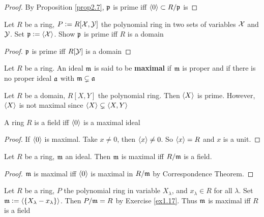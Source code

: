 \documentclass[11pt]{article}
\begin{document}
\begin{proof}
By Proposition \ref{prop2.7}, \(\mathfrak{p}\) is prime iff \(\langle0\rangle\subset R/\mathfrak{p}\) is
\end{proof}

\begin{exercise}
\label{ex2.9}
Let \(R\) be a ring, \(P:=R[\mathcal{X},\mathcal{Y}]\) the polynomial ring in two sets of
variables \(\mathcal{X}\) and \(\mathcal{Y}\). Set \(\mathfrak{p}:=\langle\mathcal{X}\rangle\). Show \(\mathfrak{p}\) is
prime iff \(R\) is a domain
\end{exercise}

\begin{proof}
\(\mathfrak{p}\) is prime iff \(R[\mathcal{Y}]\) is a domain
\end{proof}

\begin{definition}[]
Let \(R\) be a ring. An ideal \(\mathfrak{m}\) is said to be \textbf{maximal} if \(\mathfrak{m}\) is
proper and if there is no proper ideal \(\mathfrak{a}\) with \(\mathfrak{m}\subsetneq\mathfrak{a}\)
\end{definition}

\begin{examplle}[]
Let \(R\) be a domain, \(R[X,Y]\) the polynomial ring. Then \(\langle X\rangle\) is
prime. However, \(\langle X\rangle\) is not maximal since \(\langle X\rangle\subsetneq\langle X,Y\rangle\)
\end{examplle}

\begin{proposition}[]
\label{2.12}
A ring \(R\) is a field iff \(\langle0\rangle\) is a maximal ideal
\end{proposition}

\begin{proof}
If \(\langle0\rangle\) is  maximal. Take \(x\neq0\), then \(\langle x\rangle\neq0\). So \(\langle
   x\rangle=R\) and \(x\) is a unit.
\end{proof}

\begin{corollary}[]
\label{2.13}
Let \(R\) be a ring, \(\mathfrak{m}\) an ideal. Then \(\mathfrak{m}\) is maximal iff \(R/\mathfrak{m}\)
is a field.
\end{corollary}

\begin{proof}
\(\mathfrak{m}\) is maximal iff \(\langle0\rangle\) is maximal in \(R/\mathfrak{m}\) by Correspondence Theorem.
\end{proof}

\begin{examplle}[]
Let \(R\) be a ring, \(P\) the polynomial ring in variable \(X_\lambda\), and
\(x_\lambda\in R\) for all \(\lambda\). Set \(\mathfrak{m}:=\langle\{X_\lambda-x_\lambda\}\rangle\).
Then \(P/\mathfrak{m}=R\) by Exercise \ref{ex1.17}. Thus \(\mathfrak{m}\) is maximal iff \(R\) is a field
\end{examplle}
\end{document}
